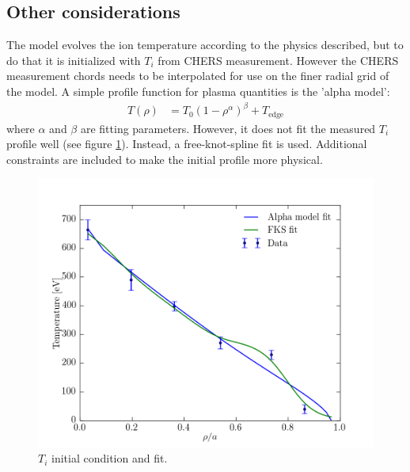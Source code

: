 \subsection{Other considerations}

The model evolves the ion temperature according to the physics described, but to do that it is initialized with $T_i$ from CHERS measurement. However the CHERS measurement chords needs to be interpolated for use on the finer radial grid of the model. 
A simple profile function for plasma quantities is the 'alpha model':
\begin{align}
    T(\rho) &= T_0(1 - \rho^\alpha)^\beta + T_{\text{edge}}
\end{align}
where $\alpha$ and $\beta$ are fitting parameters. However, it does not fit the measured $T_i$ profile well (see figure \ref{fig:init_ti}). Instead, a free-knot-spline fit is used. Additional constraints are included to make the initial profile more physical. 
\begin{figure}
	\centering
	\includegraphics[width = 1.\linewidth]{./implementation/init_ti.png}
	\caption{$T_i$ initial condition and fit.}\label{fig:init_ti}
\end{figure}
